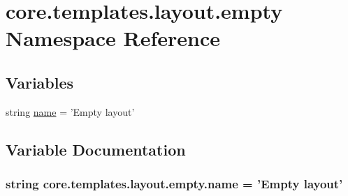 \hypertarget{namespacecore_1_1templates_1_1layout_1_1empty}{\section{core.\-templates.\-layout.\-empty Namespace Reference}
\label{namespacecore_1_1templates_1_1layout_1_1empty}
}
\subsection*{Variables}
\begin{DoxyCompactItemize}
\item 
string \hyperlink{namespacecore_1_1templates_1_1layout_1_1empty_a8dbeb9bbaeff8ee7a6d40873fdbf81cc}{name} = 'Empty layout'
\end{DoxyCompactItemize}


\subsection{Variable Documentation}
\hypertarget{namespacecore_1_1templates_1_1layout_1_1empty_a8dbeb9bbaeff8ee7a6d40873fdbf81cc}{
\subsubsection[{name}]{\setlength{\rightskip}{0pt plus 5cm}string core.\-templates.\-layout.\-empty.\-name = 'Empty layout'}}\label{namespacecore_1_1templates_1_1layout_1_1empty_a8dbeb9bbaeff8ee7a6d40873fdbf81cc}
